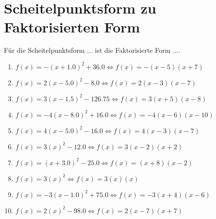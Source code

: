 \documentclass{article}%
\begin{document}
%
\section{Scheitelpunktsform zu Faktorisierten Form}%
\label{sec:ScheitelpunktsformzuFaktorisiertenForm}%
Für die Scheitelpunktsform ... ist die Faktorisierte Form ....%
\begin{enumerate}[label=\alph*)]%
\item%
\newline\vspace{0.5cm}$f(x)=-(x+1.0)^2 +36.0\Leftrightarrow f(x)=-(x-5)(x+7)$%
\item%
\newline\vspace{0.5cm}$f(x)=2(x-5.0)^2 -8.0\Leftrightarrow f(x)=2(x-3)(x-7)$%
\item%
\newline\vspace{0.5cm}$f(x)=3(x-1.5)^2 -126.75\Leftrightarrow f(x)=3(x+5)(x-8)$%
\item%
\newline\vspace{0.5cm}$f(x)=-4(x-8.0)^2 +16.0\Leftrightarrow f(x)=-4(x-6)(x-10)$%
\item%
\newline\vspace{0.5cm}$f(x)=4(x-5.0)^2 -16.0\Leftrightarrow f(x)=4(x-3)(x-7)$%
\item%
\newline\vspace{0.5cm}$f(x)=3(x)^2 -12.0\Leftrightarrow f(x)=3(x-2)(x+2)$%
\item%
\newline\vspace{0.5cm}$f(x)=(x+3.0)^2 -25.0\Leftrightarrow f(x)=(x+8)(x-2)$%
\item%
\newline\vspace{0.5cm}$f(x)=3(x)^2\Leftrightarrow f(x)=3(x)(x)$%
\item%
\newline\vspace{0.5cm}$f(x)=-3(x-1.0)^2 +75.0\Leftrightarrow f(x)=-3(x+4)(x-6)$%
\item%
\newline\vspace{0.5cm}$f(x)=2(x)^2 -98.0\Leftrightarrow f(x)=2(x-7)(x+7)$%
\end{enumerate}

%
\end{document}
